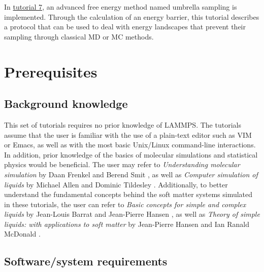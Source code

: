\documentclass[9pt,tutorial]{livecoms}
\begin{document}
In \hyperref[umbrella-sampling-label]{tutorial 7}, an advanced free energy method named umbrella sampling is implemented. Through the calculation of an energy barrier, this tutorial describes a protocol that can be used to deal with energy landscapes that prevent their sampling through classical MD or MC methods.

\section{Prerequisites}


\subsection{Background knowledge}

This set of tutorials requires no prior knowledge of LAMMPS. The tutorials assume that the user is familiar with the use of a plain-text editor such as VIM or Emacs, as well as with the most basic Unix/Linux command-line interactions. In addition, prior knowledge of the basics of molecular simulations and statistical physics would be beneficial. The user may refer to \textit{Understanding molecular simulation} by Daan Frenkel and Berend Smit \cite{frenkel2023understanding}, as well as \textit{Computer simulation of liquids} by Michael Allen and Dominic Tildesley \cite{allen2017computer}. Additionally, to better understand the fundamental concepts behind the soft matter systems simulated in these tutorials, the user can refer to \textit{Basic concepts for simple and complex liquids} by Jean-Louis Barrat and Jean-Pierre Hansen \cite{barrat2003basic}, as well as \textit{Theory of simple liquids: with applications to soft matter} by Jean-Pierre Hansen and Ian Ranald McDonald \cite{hansen2013theory}.

\subsection{Software/system requirements}
\end{document}
